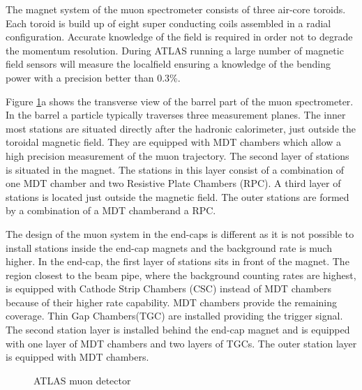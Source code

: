 \documentclass[a4paper, oneside]{book}
\begin{document}
					The magnet system of the muon spectrometer consists of three air-core toroids. Each toroid is build up of eight super conducting coils assembled in a radial configuration. Accurate knowledge of the field is required in order not to degrade the momentum resolution. During ATLAS running a large number of magnetic field sensors will measure the localfield ensuring a knowledge of the bending power with a precision better than 0.3\%. 
					
					Figure \ref{fig:ATLAS muon detector}a shows the transverse view of the barrel part of the muon spectrometer. In the barrel a particle typically traverses three measurement planes. The inner most stations are situated directly after the hadronic calorimeter, just outside the toroidal magnetic field. They are equipped with MDT chambers which allow a high precision measurement of the muon trajectory. The second layer of stations is situated in the magnet. The stations in this layer consist of a combination of one MDT chamber and two Resistive Plate Chambers (RPC). A third layer of stations is located just outside the magnetic field. The outer stations are formed by a combination of a MDT chamberand a RPC.
					
					The design of the muon system in the end-caps is different as it is not possible to install stations inside the end-cap magnets and the background rate is much higher. In the end-cap, the first layer of stations sits in front of the magnet. The region closest to the beam pipe, where the background counting rates are highest, is equipped with Cathode Strip Chambers (CSC) instead of MDT chambers because of their higher rate capability. MDT chambers provide the remaining coverage. Thin Gap Chambers(TGC) are installed providing the trigger signal. The second station layer is installed behind the end-cap magnet and is equipped with one layer of MDT chambers and two layers of TGCs. The outer station layer is equipped with MDT chambers.
					\begin{figure} [H]
						\centering
						 \quad
						\caption{ATLAS muon detector}
						\label{fig:ATLAS muon detector}
					\end{figure}
				
\end{document}

